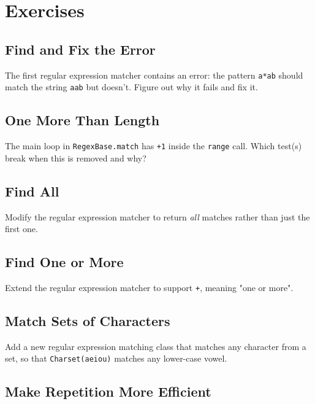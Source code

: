 \documentclass{scrbook}
\begin{document}
\section{Exercises}\label{matching-exercises}

\subsection*{Find and Fix the Error}


The first regular expression matcher contains an error:
the pattern \texttt{{\textquotesingle}a*ab{\textquotesingle}} should match the string \texttt{{\textquotesingle}aab{\textquotesingle}} but doesn't.
Figure out why it fails and fix it.

\subsection*{One More Than Length}


The main loop in \texttt{RegexBase.match} has \texttt{+1} inside the \texttt{range} call.
Which test(s) break when this is removed and why?

\subsection*{Find All}


Modify the regular expression matcher to return \emph{all} matches rather than just the first one.

\subsection*{Find One or More}


Extend the regular expression matcher to support \texttt{+}, meaning "one or more".

\subsection*{Match Sets of Characters}


Add a new regular expression matching class that matches any character from a set,
so that \texttt{Charset({\textquotesingle}aeiou{\textquotesingle})} matches any lower-case vowel.

\subsection*{Make Repetition More Efficient}
\end{document}
